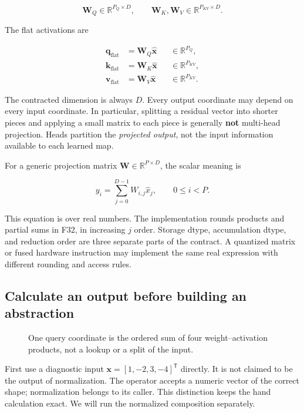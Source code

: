 \documentclass[
  10pt,
]{article}
\begin{document}
\[
\mathbf{W}_Q\in\mathbb{R}^{P_Q\times D},\qquad
\mathbf{W}_K,\mathbf{W}_V\in\mathbb{R}^{P_{KV}\times D}.
\]

The flat activations are

\[
\begin{aligned}
\mathbf{q}_{\mathrm{flat}}&=\mathbf{W}_Q\widehat{\mathbf{x}}
    &&\in\mathbb{R}^{P_Q},\\
\mathbf{k}_{\mathrm{flat}}&=\mathbf{W}_K\widehat{\mathbf{x}}
    &&\in\mathbb{R}^{P_{KV}},\\
\mathbf{v}_{\mathrm{flat}}&=\mathbf{W}_V\widehat{\mathbf{x}}
    &&\in\mathbb{R}^{P_{KV}}.
\end{aligned}
\]

The contracted dimension is always \(D\). Every output coordinate may
depend on every input coordinate. In particular, splitting a residual
vector into shorter pieces and applying a small matrix to each piece is
generally \textbf{not} multi-head projection. Heads partition the
\emph{projected output}, not the input information available to each
learned map.

For a generic projection matrix \(\mathbf{W}\in\mathbb{R}^{P\times D}\),
the scalar meaning is

\[
y_i=\sum_{j=0}^{D-1}W_{i,j}\widehat{x}_j,
\qquad 0\le i<P.
\]

This equation is over real numbers. The implementation rounds products
and partial sums in F32, in increasing \(j\) order. Storage dtype,
accumulation dtype, and reduction order are three separate parts of the
contract. A quantized matrix or fused hardware instruction may implement
the same real expression with different rounding and access rules.

\subsection{Calculate an output before building an
abstraction}\label{calculate-an-output-before-building-an-abstraction}

\begin{figure}[H]\centering\resizebox{\linewidth}{!}{}\caption{One query coordinate is the ordered sum of four weight–activation products, not a lookup or a split of the input.}\end{figure}

First use a diagnostic input \(\mathbf{x}=[1,-2,3,-4]^{\mathsf T}\)
directly. It is not claimed to be the output of normalization. The
operator accepts a numeric vector of the correct shape; normalization
belongs to its caller. This distinction keeps the hand calculation
exact. We will run the normalized composition separately.
\end{document}
